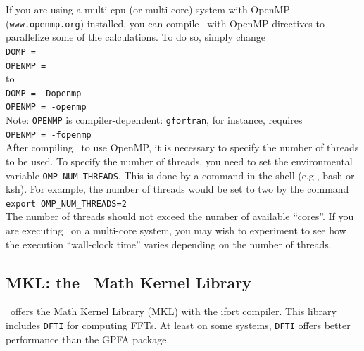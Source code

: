 If you are using a multi-cpu (or multi-core) system with OpenMP 
({\tt www.openmp.org}) installed, you can compile \ddscatv\ with OpenMP
directives to parallelize some of the calculations.
To do so, simply change\\
 {\tt DOMP       =}\\
 {\tt OPENMP     =}\\
to\\
 {\tt DOMP       = -Dopenmp}\\
 {\tt OPENMP     = -openmp}\\
Note: {\tt OPENMP} is compiler-dependent: {\tt gfortran}, for instance,
requires\\
 {\tt OPENMP     = -fopenmp}\\

After compiling \ddscatv\ to use OpenMP,
it is necessary to specify the number of threads to be used.
To specify the number of threads, you need to set the environmental
variable {\tt OMP\_NUM\_THREADS}. 
This is done by a command in the shell (e.g., bash or
ksh).  For example, the number of threads would be set to two by
the command\\
 {\tt export OMP\_NUM\_THREADS=2}\\
The number of threads should not exceed the number of available ``cores''.
If you are executing \ddscatv\ on a multi-core system, 
you may wish to experiment to see how the execution ``wall-clock time'' 
varies depending on the number of threads.

\subsection{ MKL: the \Intel\ Math Kernel Library
            \label{sec:MKL}
            }

\Intel\ offers the Math Kernel Library (MKL) with the ifort compiler.
This library includes {\tt DFTI} for computing FFTs.
At least on some systems, {\tt DFTI} offers better performance than
the GPFA package.

